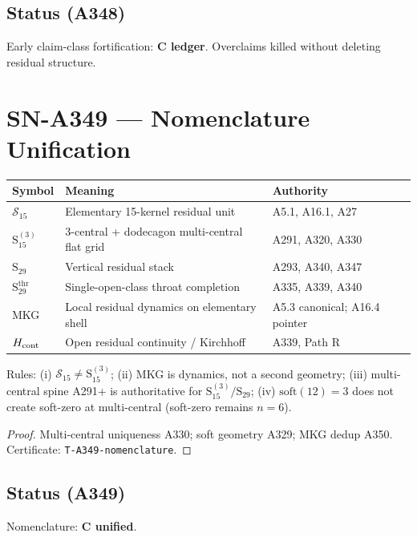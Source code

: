 \subsection*{Status (A348)}
Early claim-class fortification: \textbf{C ledger}. Overclaims killed without deleting residual structure.

\section{SN-A349 --- Nomenclature Unification}
\label{sec:SN-A349}

\begin{theorem}
\label{thm:A349}
\begin{center}
\begin{tabular}{@{}p{3.2cm}p{5.0cm}p{4.0cm}@{}}
\toprule
Symbol & Meaning & Authority \\
\midrule
$\mathcal{S}_{15}$ & Elementary 15-kernel residual unit & A5.1, A16.1, A27 \\
$\mathrm{S}_{15}^{(3)}$ & 3-central + dodecagon multi-central flat grid & A291, A320, A330 \\
$\mathrm{S}_{29}$ & Vertical residual stack & A293, A340, A347 \\
$\mathrm{S}_{29}^{\mathrm{thr}}$ & Single-open-class throat completion & A335, A339, A340 \\
MKG & Local residual dynamics on elementary shell & A5.3 canonical; A16.4 pointer \\
$H_{\rm cont}$ & Open residual continuity / Kirchhoff & A339, Path R \\
\bottomrule
\end{tabular}
\end{center}
Rules: (i) $\mathcal{S}_{15}\neq\mathrm{S}_{15}^{(3)}$; (ii) MKG is dynamics, not a second geometry; (iii) multi-central spine A291+ is authoritative for $\mathrm{S}_{15}^{(3)}/\mathrm{S}_{29}$; (iv) $\mathrm{soft}(12)=3$ does not create soft-zero at multi-central (soft-zero remains $n=6$).
\end{theorem}

\begin{proof}
Multi-central uniqueness A330; soft geometry A329; MKG dedup A350. Certificate: \texttt{T-A349-nomenclature}.
\end{proof}

\subsection*{Status (A349)}
Nomenclature: \textbf{C unified}.

